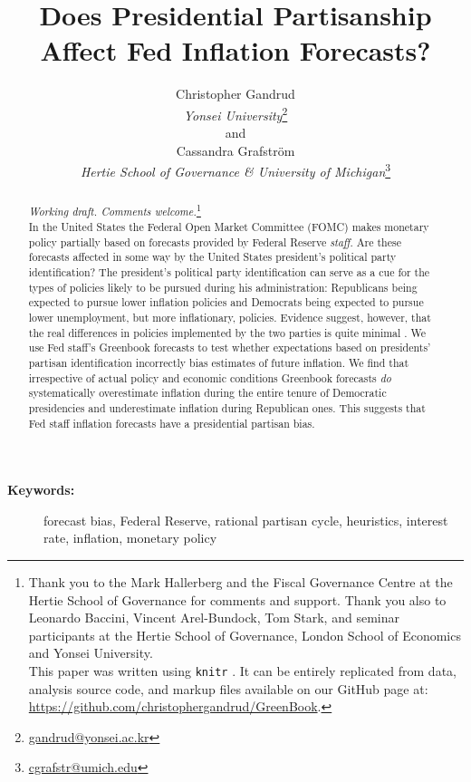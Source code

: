 \documentclass[a4paper]{article}\usepackage{graphicx, color}
\title{Does Presidential Partisanship Affect Fed Inflation Forecasts?}
\author{Christopher Gandrud \\
                {\emph{Yonsei University}}\footnote{\href{mailto:gandrud@yonsei.ac.kr}{gandrud@yonsei.ac.kr}} \\
                and \\
            Cassandra Grafstr\"{o}m \\
                {\emph{Hertie School of Governance \& University of Michigan}}\footnote{\href{mailto:cgrafstr@umich.edu}{cgrafstr@umich.edu}}}
\begin{document}
\maketitle

\begin{abstract}
\noindent\emph{Working draft. Comments welcome.}\footnote{Thank you to the Mark Hallerberg and the Fiscal Governance Centre at the Hertie School of Governance for comments and support. Thank you also to Leonardo Baccini, Vincent Arel-Bundock, Tom Stark, and seminar participants at the Hertie School of Governance, London School of Economics and Yonsei University. \\
This paper was written using {\tt{knitr}} \citep{knitr2013}. It can be entirely replicated from data, analysis source code, and markup files available on our GitHub page at: {\url{https://github.com/christophergandrud/GreenBook}}.} \\[0.2cm]

In the United States the Federal Open Market Committee (FOMC) makes monetary policy partially based on forecasts provided by Federal Reserve \emph{staff}. Are these forecasts affected in some way by the United States president's political party identification? The president's political party identification can serve as a cue for the types of policies likely to be pursued during his administration: Republicans being expected to pursue lower inflation policies and Democrats being expected to pursue lower unemployment, but more inflationary, policies. Evidence suggest, however, that the real differences in policies implemented by the two parties is quite minimal \citep{Bartels2008}. We use Fed staff's Greenbook forecasts to test whether expectations based on presidents' partisan identification incorrectly bias estimates of future inflation. We find that irrespective of actual policy and economic conditions Greenbook forecasts {\emph{do}} systematically overestimate inflation during the entire tenure of Democratic presidencies and underestimate inflation during Republican ones. This suggests that Fed staff inflation forecasts have a presidential partisan bias.

\end{abstract}

\begin{description}
  \item [{\textbf{Keywords:}}] forecast bias, Federal Reserve, rational partisan cycle, heuristics, interest rate, inflation, monetary policy
\end{description}
\end{document}
